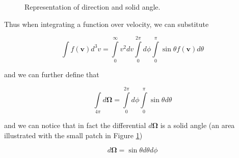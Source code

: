 \begin{figure}[ht!]
\protect {}\protect
\caption{\label{fig:solidangle} \footnotesize{Representation of direction and solid angle.}}
\end{figure}

Thus when integrating a function over velocity, we can substitute

\begin{equation}
\int f(\mathbf{v})d^3v=\int\limits_0^\infty v^2 dv\int\limits_0^{2\pi}d\phi\int\limits_0^\pi \sin\theta f(\mathbf{v})d\theta
\end{equation}

\noindent and we can further define that 

\begin{equation}
\int\limits_{4\pi}d\mathbf{\Omega}=\int\limits_0^{2\pi}d\phi\int\limits_0^\pi \sin\theta d\theta
\end{equation}

\noindent and we can notice that in fact the differential $d\mathbf{\Omega}$ is a solid angle (an area illustrated with the small patch in Figure \ref{fig:solidangle})

\[
d\mathbf{\Omega}=\sin\theta d\theta d\phi
\]

